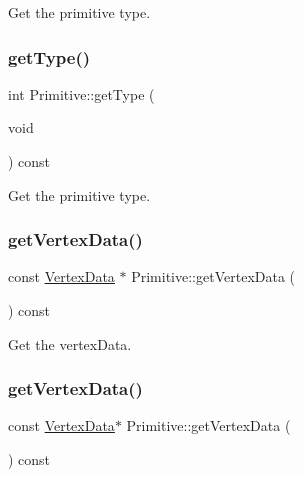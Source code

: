 Get the primitive type. \mbox{\label{classPrimitive_ac2080c271a744f9967849ac9c50ac232}} 
\subsubsection{\texorpdfstring{get\+Type()}{getType()}\hspace{0.1cm}{\footnotesize\ttfamily [2/2]}}
{\footnotesize\ttfamily int Primitive\+::get\+Type (\begin{DoxyParamCaption}\item[{void}]{ }\end{DoxyParamCaption}) const\hspace{0.3cm}{\ttfamily [inline]}}

Get the primitive type. \mbox{\label{classPrimitive_a693a1a18b0378850950240ee43249f36}} 
\subsubsection{\texorpdfstring{get\+Vertex\+Data()}{getVertexData()}\hspace{0.1cm}{\footnotesize\ttfamily [1/2]}}
{\footnotesize\ttfamily const \hyperlink{classVertexData}{Vertex\+Data} $\ast$ Primitive\+::get\+Vertex\+Data (\begin{DoxyParamCaption}{ }\end{DoxyParamCaption}) const}

Get the vertex\+Data. \mbox{\label{classPrimitive_ad530735df14ec8c9a04f4d3832e6535d}} 
\subsubsection{\texorpdfstring{get\+Vertex\+Data()}{getVertexData()}\hspace{0.1cm}{\footnotesize\ttfamily [2/2]}}
{\footnotesize\ttfamily const \hyperlink{classVertexData}{Vertex\+Data}$\ast$ Primitive\+::get\+Vertex\+Data (\begin{DoxyParamCaption}{ }\end{DoxyParamCaption}) const}

